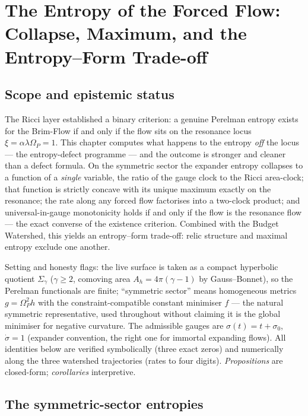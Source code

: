 \documentclass[11pt,a4paper,oneside]{book}
\newcommand{\Op}{\Omega_P}
\theoremstyle{plain}
\theoremstyle{definition}
\theoremstyle{remark}
\begin{document}
\chapter{The Entropy of the Forced Flow: Collapse, Maximum, and the Entropy--Form Trade-off}

\section*{Scope and epistemic status}
The Ricci layer established a binary criterion: a genuine Perelman entropy exists for the Brim-Flow if
and only if the flow sits on the resonance locus $\xi=\alpha\lambda\Op=1$. This chapter computes what
happens to the entropy \emph{off} the locus --- the entropy-defect programme --- and the outcome is
stronger and cleaner than a defect formula. On the symmetric sector the expander entropy collapses to a
function of a \emph{single} variable, the ratio of the gauge clock to the Ricci area-clock; that
function is strictly concave with its unique maximum exactly on the resonance; the rate along any
forced flow factorises into a two-clock product; and universal-in-gauge monotonicity holds if and only
if the flow is the resonance flow --- the exact converse of the existence criterion. Combined with the
Budget Watershed, this yields an entropy--form trade-off: relic structure and maximal entropy exclude
one another.

Setting and honesty flags: the live surface is taken as a compact hyperbolic quotient $\Sigma_\gamma$
($\gamma\ge2$, comoving area $A_h=4\pi(\gamma-1)$ by Gauss--Bonnet), so the Perelman functionals are
finite; ``symmetric sector'' means homogeneous metrics $g=\Op^2h$ with the constraint-compatible
constant minimiser $f$ --- the natural symmetric representative, used throughout without claiming it is
the global minimiser for negative curvature. The admissible gauges are $\sigma(t)=t+\sigma_0$,
$\dot\sigma=1$ (expander convention, the right one for immortal expanding flows). All identities below
are verified symbolically (three exact zeros) and numerically along the three watershed trajectories
(rates to four digits). \emph{Propositions} are closed-form; \emph{corollaries} interpretive.

\section{The symmetric-sector entropies}
\end{document}
